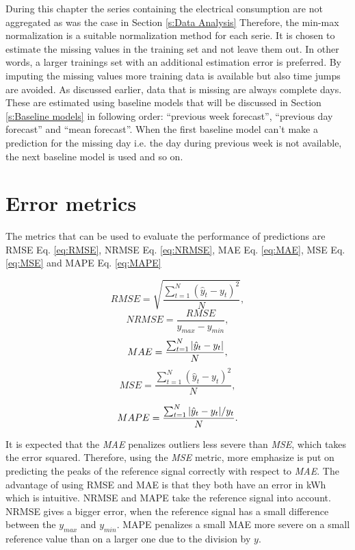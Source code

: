 During this chapter the series containing the electrical consumption are not aggregated as was the case in Section \ref{s:Data Analysis} Therefore, the min-max normalization is a suitable normalization method for each serie. It is chosen to estimate the missing values in the training set and not leave them out. In other words, a larger trainings set with an additional estimation error is preferred. By imputing the missing values more training data is available but also time jumps are avoided. As discussed earlier, data that is missing are always complete days. These are estimated using baseline models that will be discussed in Section \ref{s:Baseline models} in following order: ``previous week forecast'', ``previous day forecast'' and ``mean forecast''. When the first baseline model can't make a prediction for the missing day i.e. the day during previous week is not available, the next baseline model is used and so on.\\

\section{Error metrics}\label{s:Error metrics}
The metrics that can be used to evaluate the performance of predictions are  RMSE Eq. \ref{eq:RMSE}, NRMSE Eq. \ref{eq:NRMSE},  MAE  Eq. \ref{eq:MAE},  MSE Eq. \ref{eq:MSE} and MAPE Eq. \ref{eq:MAPE}

\begin{equation}\label{eq:RMSE}
	RMSE = \sqrt{\frac{\sum_{t=1}^{N}(\hat{y}_t-y_t)^2}{N}},
\end{equation}
\begin{equation}\label{eq:NRMSE}
	NRMSE = \frac{RMSE}{y_{max}-y_{min}},
\end{equation}
\begin{equation}\label{eq:MAE}
	MAE = \frac{\sum_{t=1}^{N}\abs{\hat{y}_t-y_t}}{N},
\end{equation}
\begin{equation}\label{eq:MSE}
	MSE = \frac{\sum_{t=1}^{N}(\hat{y}_t-y_t)^2}{N},
\end{equation}

\begin{equation}\label{eq:MAPE}
	MAPE = \frac{\sum_{t=1}^{N}\abs{\hat{y}_t-y_t}/y_t}{N}.
\end{equation}


It is expected that the \textit{MAE} penalizes outliers less severe than \textit{MSE}, which takes the error squared. Therefore, using the \textit{MSE} metric, more emphasize is put on predicting the peaks of the reference signal correctly with respect to \textit{MAE}. The advantage of using  RMSE  and MAE  is that they both have an error in kWh which is intuitive.  NRMSE  and  MAPE  take the reference signal into account. NRMSE  gives a bigger error, when the reference signal has a small difference between the $ y_{max} $ and $ y_{min} $.  MAPE  penalizes a small MAE more severe on a small reference value than on a larger one due to the division by $ y $.


